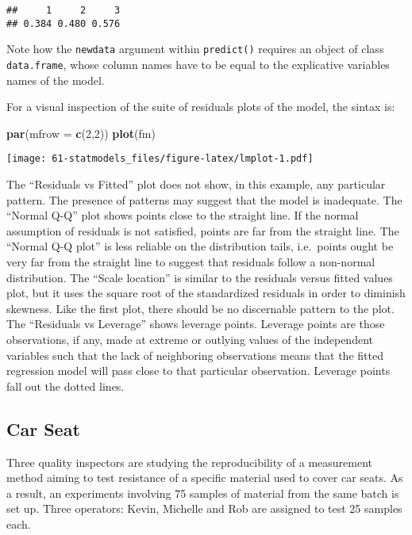 \documentclass[]{book}
\newenvironment{Shaded}{\begin{snugshade}}{\end{snugshade}}
\newcommand{\KeywordTok}[1]{\textcolor[rgb]{0.13,0.29,0.53}{\textbf{{#1}}}}
\newcommand{\DataTypeTok}[1]{\textcolor[rgb]{0.13,0.29,0.53}{{#1}}}
\newcommand{\DecValTok}[1]{\textcolor[rgb]{0.00,0.00,0.81}{{#1}}}
\newcommand{\NormalTok}[1]{{#1}}
\begin{document}
\begin{verbatim}
##     1     2     3 
## 0.384 0.480 0.576
\end{verbatim}

Note how the \texttt{newdata} argument within \texttt{predict()}
requires an object of class \texttt{data.frame}, whose column names have
to be equal to the explicative variables names of the model.

For a visual inspection of the suite of residuals plots of the model,
the sintax is:

\begin{Shaded}
\begin{Highlighting}[]
\KeywordTok{par}\NormalTok{(}\DataTypeTok{mfrow =} \KeywordTok{c}\NormalTok{(}\DecValTok{2}\NormalTok{,}\DecValTok{2}\NormalTok{))}
\KeywordTok{plot}\NormalTok{(fm)}
\end{Highlighting}
\end{Shaded}

\texttt{[image: 61-statmodels\_files/figure-latex/lmplot-1.pdf]}

The ``Residuals vs Fitted'' plot does not show, in this example, any
particular pattern. The presence of patterns may suggest that the model
is inadequate. The ``Normal Q-Q'' plot shows points close to the
straight line. If the normal assumption of residuals is not satisfied,
points are far from the straight line. The ``Normal Q-Q plot'' is less
reliable on the distribution tails, i.e.~points ought be very far from
the straight line to suggest that residuals follow a non-normal
distribution. The ``Scale location'' is similar to the residuals versus
fitted values plot, but it uses the square root of the standardized
residuals in order to diminish skewness. Like the first plot, there
should be no discernable pattern to the plot. The ``Residuals vs
Leverage'' shows leverage points. Leverage points are those
observations, if any, made at extreme or outlying values of the
independent variables such that the lack of neighboring observations
means that the fitted regression model will pass close to that
particular observation. Leverage points fall out the dotted lines.

\subsection{Car Seat}\label{car-seat}

Three quality inspectors are studying the reproducibility of a
measurement method aiming to test resistance of a specific material used
to cover car seats. As a result, an experiments involving 75 samples of
material from the same batch is set up. Three operators: Kevin, Michelle
and Rob are assigned to test 25 samples each.
\end{document}

